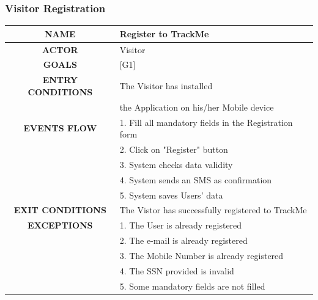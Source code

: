 \documentclass[12pt,a4paper]{article}
\begin{document}
		\subsubsection{Visitor Registration}
		\begin{center}
			\begin{tabular}{| c | l |}
				\hline
				\textbf{NAME} & Register to TrackMe \\
				\hline
				\textbf{ACTOR} & Visitor \\
				\hline
				\textbf{GOALS} & [G1] \\
				\hline
				\textbf{ENTRY CONDITIONS} & The Visitor has installed \\
				&	the Application on his/her Mobile device \\ \hline
				\textbf{EVENTS FLOW}  &
				1. Fill all mandatory fields in the Registration form\\
				&2. Click on "Register" button\\
				&3. System checks data validity\\
				&4. System sends an SMS as confirmation\\
				&5. System saves Users' data\\
				\hline
				\textbf{EXIT CONDITIONS}  & The Vistor has successfully registered to TrackMe\\ \hline
				\textbf{EXCEPTIONS} &
				1. The User is already registered\\
				&2. The e-mail is already registered\\
				&3. The Mobile Number is already registered\\
				&4. The SSN provided is invalid\\
				&5. Some mandatory fields are not filled\\
				\hline
			\end{tabular}
		\end{center}
\end{document}
